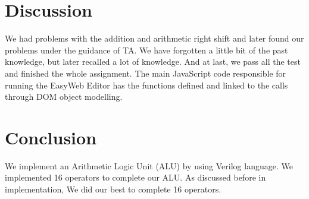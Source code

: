 \documentclass[12pt,a4paper]{article}
\begin{document}
\newpage
\section{Discussion}

We had problems with the addition and arithmetic right shift and later found our problems under the guidance of TA.
We have forgotten a little bit of the past knowledge, but later recalled a lot of knowledge.
And at last, we pass all the test and finished the whole assignment.
The main JavaScript code responsible for running the EasyWeb Editor has the functions defined and linked to the calls through DOM object modelling.

\section{Conclusion}

We implement an Arithmetic Logic Unit (ALU) by using Verilog language.
We implemented 16 operators to complete our ALU.
As discussed before in implementation, We did our best to complete 16 operators.
\end{document}
